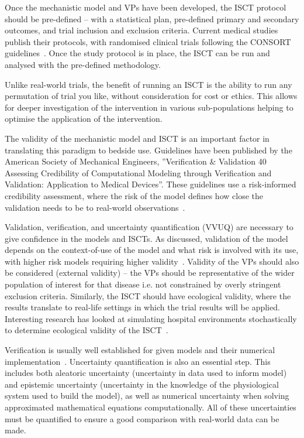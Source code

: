 \documentclass{article}
\begin{document}
Once the mechanistic model and VPs have been developed, the ISCT protocol should be pre-defined – with a statistical plan, pre-defined primary and secondary outcomes, and trial inclusion and exclusion criteria. Current medical studies publish their protocols, with randomised clinical trials following the CONSORT guidelines~\cite{Schulz2010}. Once the study protocol is in place, the ISCT can be run and analysed with the pre-defined methodology.

Unlike real-world trials, the benefit of running an ISCT is the ability to run any permutation of trial you like, without consideration for cost or ethics. This allows for deeper investigation of the intervention in various sub-populations helping to optimise the application of the intervention.

The validity of the mechanistic model and ISCT is an important factor in translating this paradigm to bedside use. Guidelines have been published by the American Society of Mechanical Engineers, ''Verification \& Validation 40 Assessing Credibility of Computational Modeling through Verification and Validation: Application to Medical Devices''. These guidelines use a risk-informed credibility assessment, where the risk of the model defines how close the validation needs to be to real-world observations~\cite{ASME2018}.

Validation, verification, and uncertainty quantification (VVUQ) are necessary to give confidence in the models and ISCTs. As discussed, validation of the model depends on the context-of-use of the model and what risk is involved with its use, with higher risk models requiring higher validity~\cite{Pappalardo2019}. Validity of the VPs should also be considered (external validity) – the VPs should be representative of the wider population of interest for that disease i.e. not constrained by overly stringent exclusion criteria. Similarly, the ISCT should have ecological validity, where the results translate to real-life settings in which the trial results will be applied. Interesting research has looked at simulating hospital environments stochastically to determine ecological validity of the ISCT~\cite{Fuertinger2018}.

Verification is usually well established for given models and their numerical implementation~\cite{Curreli2021, Pappalardo2019}. Uncertainty quantification is also an essential step. This includes both aleatoric uncertainty (uncertainty in data used to inform model) and epistemic uncertainty (uncertainty in the knowledge of the physiological system used to build the model), as well as numerical uncertainty when solving approximated mathematical equations computationally. All of these uncertainties must be quantified to ensure a good comparison with real-world data can be made.
\end{document}
